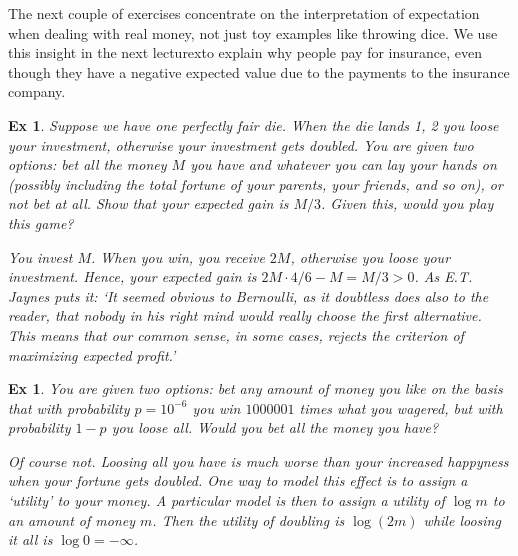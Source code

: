 \documentclass[a4paper,11pt]{article}
\newtheorem{exercise}[theorem]{Ex}
\begin{document}
The next couple of exercises concentrate on the interpretation of expectation when dealing with real money, not just toy examples like throwing dice.
We use this insight in the next lecturexto explain why people pay for insurance, even though they have a negative expected value due to the payments to the insurance company.

\begin{exercise}
Suppose we have one perfectly fair die.
When the die lands 1, 2 you loose your investment, otherwise your investment gets doubled.
 You are given two options: bet all the money $M$ you have and whatever you can lay your hands on (possibly including the total fortune of your parents, your friends, and so on), or not bet at all.
Show that your expected gain is $M/3$.
Given this, would you play this game?
\begin{solution}
You invest $M$. When you win, you receive  $2M$, otherwise you loose your investment. Hence, your expected gain is $2 M\cdot 4/6 - M = M/3 > 0$.
As E.T.
Jaynes puts it: `It seemed obvious to Bernoulli, as it doubtless does also to the reader, that nobody in his right mind would really choose the first alternative.
This means that our common sense, in some cases, rejects the criterion of maximizing expected profit.'
\end{solution}
\end{exercise}

\begin{exercise}
You are given two options: bet any amount of  money you like on the basis that with probability $p=10^{-6}$ you win  $1 000 001$ times what you wagered, but with probability $1-p$ you loose all.
Would you bet all the money you have?
\begin{solution}
  Of course not.
  Loosing all you have is much worse than your increased happyness when your fortune gets doubled.
  One way to model this effect is to assign a `utility' to your money.
  A particular model is then to assign a utility of $\log m$ to an amount of money $m$. Then the  utility of doubling is $\log(2m)$ while loosing it all is $\log 0 = -\infty$.
\end{solution}
\end{exercise}
\end{document}
